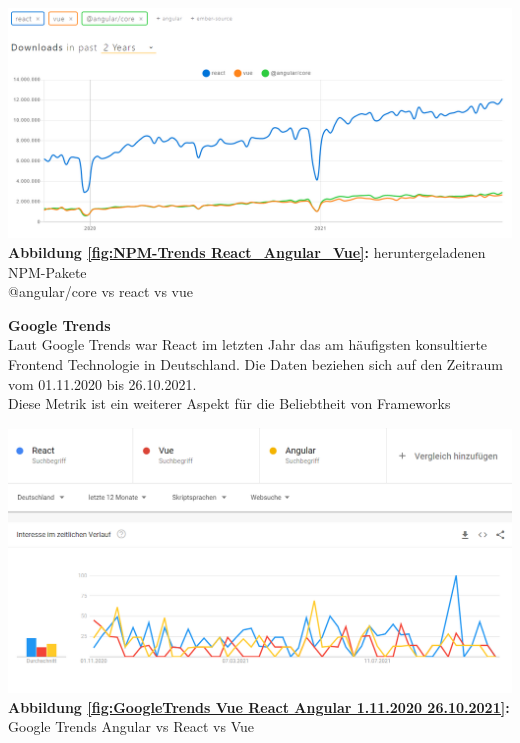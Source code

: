 \begin{center}
  \includegraphics[scale=0.4]{sources/NPM-Trends React_Angular_Vue}\label{fig:NPM-Trends React_Angular_Vue}\\
  \textbf{Abbildung \autoref{fig:NPM-Trends React_Angular_Vue}:} heruntergeladenen NPM-Pakete \\@angular/core vs react vs vue
    {\cite{NPM01}}
\end{center}

\textbf{Google Trends}\\
Laut Google Trends war React im letzten Jahr das am häufigsten konsultierte Frontend Technologie in Deutschland.
Die Daten beziehen sich auf den Zeitraum vom 01.11.2020 bis 26.10.2021.
\\
Diese Metrik ist ein weiterer Aspekt für die Beliebtheit von Frameworks
\begin{center}
  \includegraphics[scale=0.5]{sources/GoogleTrends Vue React Angular 1.11.2020 26.10.2021}\label{fig:GoogleTrends Vue React Angular 1.11.2020 26.10.2021}\\
  \textbf{Abbildung \autoref{fig:GoogleTrends Vue React Angular 1.11.2020 26.10.2021}:} Google Trends Angular vs React vs Vue
    {\cite{GO01}}
\end{center}

